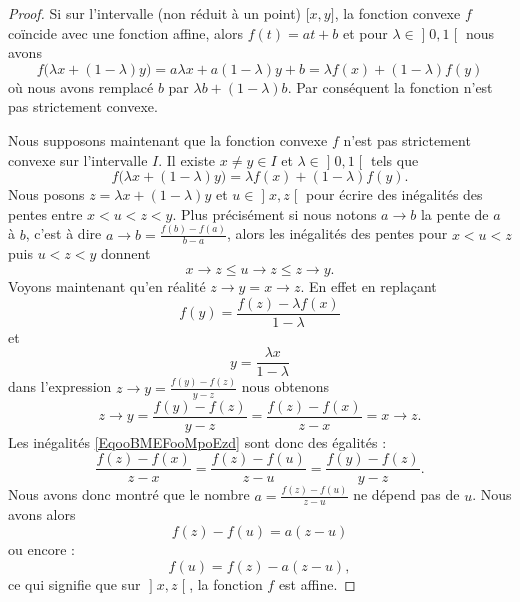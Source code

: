 \begin{proof}
    Si sur l'intervalle (non réduit à un point) \( \mathopen[ x , y \mathclose]\), la fonction convexe \( f\) coïncide avec une fonction affine, alors \( f(t)=at+b\) et pour \( \lambda\in\mathopen] 0 , 1 \mathclose[\) nous avons
        \begin{equation}
                f\big( \lambda x+(1-\lambda)y \big)=a\lambda x+a(1-\lambda)y+b=\lambda f(x)+(1-\lambda)f(y)
        \end{equation}
        où nous avons remplacé \( b\) par \( \lambda b+(1-\lambda)b\). Par conséquent la fonction n'est pas strictement convexe.

    Nous supposons maintenant que la fonction convexe \( f\) n'est pas strictement convexe sur l'intervalle \( I\). Il existe \( x\neq y\in I\) et \( \lambda\in \mathopen] 0 , 1 \mathclose[\) tels que
        \begin{equation}
            f\big( \lambda x+(1-\lambda)y \big)=\lambda f(x)+(1-\lambda)f(y).
        \end{equation}
    Nous posons \( z=\lambda x+(1-\lambda)y\) et \( u\in\mathopen] x , z \mathclose[\) pour écrire des inégalités des pentes entre \( x<u<z<y\). Plus précisément si nous notons \( a\to b\) la pente de \( a\) à \( b\), c'est à dire \( a\to b=\frac{ f(b)-f(a) }{ b-a }\), alors les inégalités des pentes pour \( x<u<z\) puis \( u<z<y\) donnent
        \begin{equation}        \label{EqooBMEFooMpoEzd}
            x\to z\leq u\to z\leq z\to y.
        \end{equation}
        Voyons maintenant qu'en réalité \( z\to y=x\to z\). En effet en replaçant
        \begin{equation}
            f(y)=\frac{ f(z)-\lambda f(x) }{ 1-\lambda }
        \end{equation}
        et
        \begin{equation}
            y=\frac{ \lambda x }{ 1-\lambda }
        \end{equation}
        dans l'expression \( z\to y=\frac{ f(y)-f(z) }{ y-z }\) nous obtenons
        \begin{equation}
            z\to y=\frac{ f(y)-f(z) }{ y-z }=\frac{ f(z)-f(x) }{ z-x }=x\to z.
        \end{equation}
        Les inégalités \eqref{EqooBMEFooMpoEzd} sont donc des égalités :
        \begin{equation}
            \frac{ f(z)-f(x) }{ z-x }=\frac{ f(z)-f(u) }{ z-u }=\frac{ f(y)-f(z) }{ y-z }.
        \end{equation}
        Nous avons donc montré que le nombre \( a=\frac{ f(z)-f(u) }{ z-u }\) ne dépend pas de \( u\). Nous avons alors
        \begin{equation}
            f(z)-f(u)=a(z-u) 
        \end{equation}
        ou encore :
        \begin{equation}
            f(u)=f(z)-a(z-u),
        \end{equation}
    ce qui signifie que sur \( \mathopen] x , z \mathclose[\), la fonction \( f\) est affine.
\end{proof}

